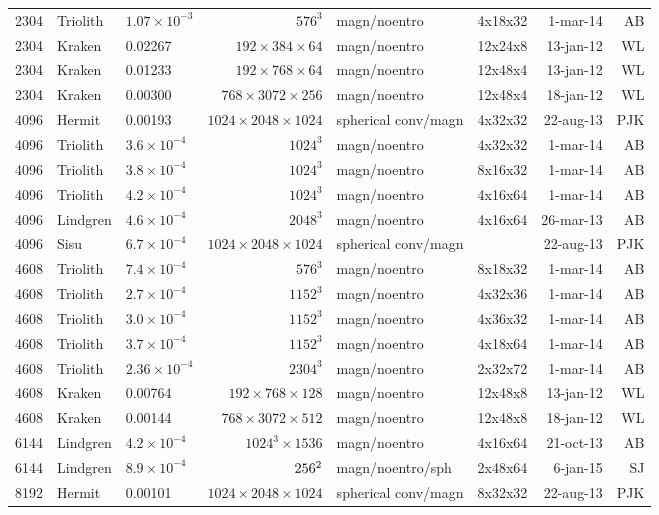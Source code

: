 \documentclass[\mydriver,12pt,twoside,notitlepage,a4paper]{article}
\begin{document}
\begin{center}
\begin{footnotesize}
\begin{longtable}{rllrlrrr}
2304&Triolith&$1.07{\!\times\!}10^{-3}$&$ 576^3$&magn/noentro&4x18x32& 1-mar-14 & AB \\
2304&Kraken&0.02267&$192{\!\times\!}384{\!\times\!}64$&magn/noentro&12x24x8&13-jan-12&WL\\
2304&Kraken&  0.01233 &$192{\!\times\!}768{\!\times\!}64$ & magn/noentro & 12x48x4 &13-jan-12 & WL\\
2304&Kraken& 0.00300  &$768{\!\times\!}3072{\!\times\!}256$ & magn/noentro & 12x48x4 &18-jan-12 & WL\\
4096&Hermit&0.00193&$1024{\!\times\!}2048{\!\times\!}1024$&spherical conv/magn&4x32x32&22-aug-13&PJK\\
4096&Triolith&$3.6{\!\times\!}10^{-4}$&$1024^3$&magn/noentro&4x32x32& 1-mar-14 & AB \\
4096&Triolith&$3.8{\!\times\!}10^{-4}$&$1024^3$&magn/noentro&8x16x32& 1-mar-14 & AB \\
4096&Triolith&$4.2{\!\times\!}10^{-4}$&$1024^3$&magn/noentro&4x16x64& 1-mar-14 & AB \\
4096&Lindgren&$4.6{\!\times\!}10^{-4}$&$2048^3$&magn/noentro&4x16x64&26-mar-13&AB\\
4096&Sisu&$6.7{\!\times\!}10^{-4}$&$1024{\!\times\!}2048{\!\times\!}1024$&spherical conv/magn& &22-aug-13&PJK\\
4608&Triolith&$7.4{\!\times\!}10^{-4}$&$ 576^3$&magn/noentro&8x18x32& 1-mar-14 & AB \\
4608&Triolith&$2.7{\!\times\!}10^{-4}$&$1152^3$&magn/noentro&4x32x36& 1-mar-14 & AB \\
4608&Triolith&$3.0{\!\times\!}10^{-4}$&$1152^3$&magn/noentro&4x36x32& 1-mar-14 & AB \\
4608&Triolith&$3.7{\!\times\!}10^{-4}$&$1152^3$&magn/noentro&4x18x64& 1-mar-14 & AB \\
4608&Triolith&$2.36{\!\times\!}10^{-4}$&$2304^3$&magn/noentro&2x32x72& 1-mar-14 & AB \\
4608& Kraken&  0.00764 &$192{\!\times\!}768{\!\times\!}128$ & magn/noentro & 12x48x8 &13-jan-12 & WL\\
4608& Kraken& 0.00144  &$768{\!\times\!}3072{\!\times\!}512$ & magn/noentro & 12x48x8 &18-jan-12 & WL\\
6144&Lindgren&$4.2{\!\times\!}10^{-4}$&$1024^3\times1536$&magn/noentro&4x16x64&21-oct-13&AB\\
6144&Lindgren&$8.9{\!\times\!}10^{-4}$&$256\time1152^2$&magn/noentro/sph&2x48x64&6-jan-15&SJ\\
8192&Hermit&0.00101&$1024{\!\times\!}2048{\!\times\!}1024$&spherical conv/magn&8x32x32&22-aug-13&PJK\\

\end{longtable}
\end{footnotesize}
\end{center}
\end{document}
